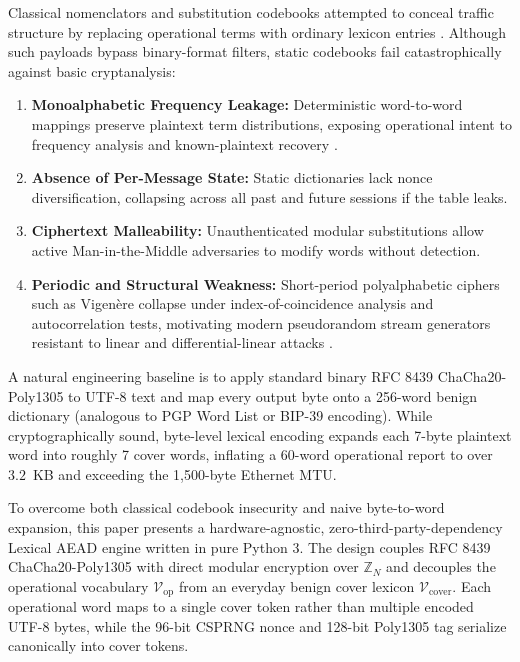 \documentclass[conference]{IEEEtran}
\begin{document}
Classical nomenclators and substitution codebooks attempted to conceal traffic structure by replacing operational terms with ordinary lexicon entries \cite{shannon1949communication, serret2022linguistic}. Although such payloads bypass binary-format filters, static codebooks fail catastrophically against basic cryptanalysis:
\begin{enumerate}
    \item \textbf{Monoalphabetic Frequency Leakage:} Deterministic word-to-word mappings preserve plaintext term distributions, exposing operational intent to frequency analysis and known-plaintext recovery \cite{shannon1949communication}.
    \item \textbf{Absence of Per-Message State:} Static dictionaries lack nonce diversification, collapsing across all past and future sessions if the table leaks.
    \item \textbf{Ciphertext Malleability:} Unauthenticated modular substitutions allow active Man-in-the-Middle adversaries to modify words without detection.
    \item \textbf{Periodic and Structural Weakness:} Short-period polyalphabetic ciphers such as Vigen\`ere collapse under index-of-coincidence analysis and autocorrelation tests, motivating modern pseudorandom stream generators resistant to linear and differential-linear attacks \cite{canteaut2025linear, todo2024differentiallinear}.
\end{enumerate}

A natural engineering baseline is to apply standard binary RFC 8439 ChaCha20-Poly1305 to UTF-8 text and map every output byte onto a 256-word benign dictionary (analogous to PGP Word List or BIP-39 encoding). While cryptographically sound, byte-level lexical encoding expands each 7-byte plaintext word into roughly 7 cover words, inflating a 60-word operational report to over $3.2$~KB and exceeding the 1,500-byte Ethernet MTU.

To overcome both classical codebook insecurity and naive byte-to-word expansion, this paper presents a hardware-agnostic, zero-third-party-dependency Lexical AEAD engine written in pure Python 3. The design couples RFC 8439 ChaCha20-Poly1305 \cite{rfc8439, bernstein2008chacha} with direct modular encryption over $\mathbb{Z}_N$ and decouples the operational vocabulary $\mathcal{V}_{\text{op}}$ from an everyday benign cover lexicon $\mathcal{V}_{\text{cover}}$. Each operational word maps to a single cover token rather than multiple encoded UTF-8 bytes, while the 96-bit CSPRNG nonce and 128-bit Poly1305 tag serialize canonically into cover tokens.
\end{document}
